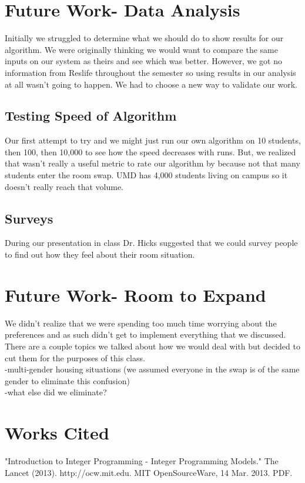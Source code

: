 \documentclass[12pt]{article}
\begin{document}
\begin{multicols}{2}
\section{Future Work- Data Analysis}
Initially we struggled to determine what we should do to show results for our algorithm. We were originally thinking we would want to compare the same inputs on our system as theirs and see which was better. However, we got no information from Reslife throughout the semester so using results in our analysis at all wasn't going to happen. We had to choose a new way to validate our work.

\subsection{Testing Speed of Algorithm}
Our first attempt to try and  we might just run our own algorithm on 10 students, then 100, then 10,000 to see how the speed decreases with runs. But, we realized that wasn't really a useful metric to rate our algorithm by because not that many students enter the room swap. UMD has 4,000 students living on campus so it doesn't really reach that volume.

\subsection{Surveys}
During our presentation in class Dr. Hicks suggested that we could survey people to find out how they feel about their room situation.

\section{Future Work- Room to Expand}
We didn't realize that we were spending too much time worrying about the preferences and as such didn't get to implement everything that we discussed. There are a couple topics we talked about how we would deal with but decided to cut them for the purposes of this class.\\
-multi-gender housing situations (we assumed everyone in the swap is of the same gender to eliminate this confusion)\\
-what else did we eliminate?

\section{Works Cited}
"Introduction to Integer Programming - Integer Programming Models." The Lancet (2013). http://ocw.mit.edu. MIT OpenSourceWare, 14 Mar. 2013. PDF.

\end{multicols}
%
% 
\end{document}

